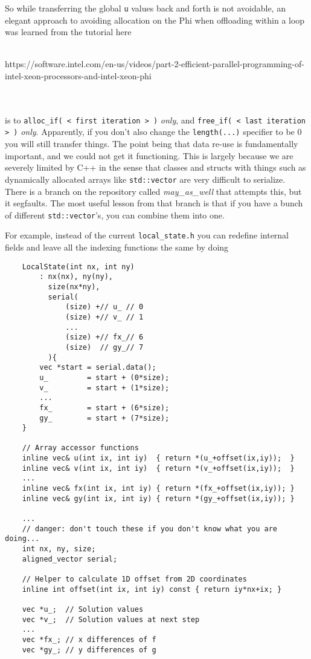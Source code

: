 So while transferring the global \texttt{u} values back and forth is not avoidable, an elegant
approach to avoiding allocation on the Phi when offloading within a loop was learned from the
tutorial here\\\\\centerline{https://software.intel.com/en-us/videos/part-2-efficient-parallel-programming-of-intel-xeon-processors-and-intel-xeon-phi}\\\\ 
is to \texttt{alloc\_if( < first iteration > )} \emph{only}, and \texttt{free\_if( < last iteration > )} \emph{only}.
Apparently, if you don't also change the \texttt{length(...)} specifier to be 0 you will still transfer things.
The point being that data re-use is fundamentally important, and we could not get it functioning.
This is largely because we are severely limited by C++ in the sense that classes and structs with things
such as dynamically allocated arrays like \texttt{std::vector} are very difficult to serialize.  There is a
branch on the repository called \emph{may\_as\_well} that attempts this, but it segfaults.  The most useful
lesson from that branch is that if you have a bunch of different \texttt{std::vector}'s, you can combine
them into one.

\noindent For example, instead of the current \texttt{local\_state.h} you can redefine internal fields and leave all the indexing functions the same
by doing
{\tiny
\begin{lstlisting}
    LocalState(int nx, int ny)
        : nx(nx), ny(ny),
          size(nx*ny),
          serial(
              (size) +// u_ // 0
              (size) +// v_ // 1
              ...
              (size) +// fx_// 6
              (size)  // gy_// 7
          ){
        vec *start = serial.data();
        u_         = start + (0*size);
        v_         = start + (1*size);
        ...
        fx_        = start + (6*size);
        gy_        = start + (7*size);
    }

    // Array accessor functions
    inline vec& u(int ix, int iy)  { return *(u_+offset(ix,iy));  }
    inline vec& v(int ix, int iy)  { return *(v_+offset(ix,iy));  }
    ...
    inline vec& fx(int ix, int iy) { return *(fx_+offset(ix,iy)); }
    inline vec& gy(int ix, int iy) { return *(gy_+offset(ix,iy)); }

    ...
    // danger: don't touch these if you don't know what you are doing...
    int nx, ny, size;
    aligned_vector serial;

    // Helper to calculate 1D offset from 2D coordinates
    inline int offset(int ix, int iy) const { return iy*nx+ix; }

    vec *u_;  // Solution values
    vec *v_;  // Solution values at next step
    ...
    vec *fx_; // x differences of f
    vec *gy_; // y differences of g
\end{lstlisting}
}


